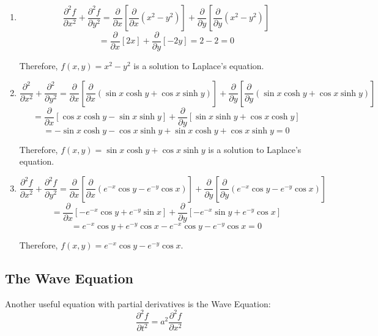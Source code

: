 \begin{Answer}[ref = laplace]
\begin{enumerate}
    \item $$\frac{\partial^2 f}{\partial x^2} + \frac{\partial^2 f}{\partial 
    y^2} = \frac{\partial}{\partial x} \left[ \frac{\partial}{\partial x} 
    \left( x^2 - y^2 \right) \right] + \frac{\partial}{\partial y} \left[ 
    \frac{\partial}{\partial y} \left( x^2 - y^2 \right) \right]$$
    $$= \frac{\partial}{\partial x} \left[ 2x \right] + \frac{\partial}{
    \partial y} \left[ -2y \right] = 2 - 2 = 0$$

    Therefore, $f(x, y) = x^2 - y^2$ is a solution to Laplace's equation. 

    \item $$\frac{\partial^2}{\partial x^2} + \frac{\partial^2}{\partial y^2} 
    = \frac{\partial}{\partial x} \left[ \frac{\partial}{\partial x} \left( 
    \sin{x} \cosh{y} + \cos{x} \sinh{y} \right) \right] + \frac{\partial}{
    \partial y} \left[ \frac{\partial}{\partial y} \left( \sin{x} \cosh{y} + 
    \cos{x} \sinh{y} \right) \right]$$
    $$= \frac{\partial}{\partial x} \left[ \cos{x} \cosh{y} - \sin{x} \sinh{y} 
    \right] + \frac{\partial}{\partial y} \left[ \sin{x} \sinh{y} + \cos{x} 
    \cosh{y} \right]$$
    $$= -\sin{x}\cosh{y} - \cos{x}\sinh{y} + \sin{x}\cosh{y} + \cos{x} \sinh{
    y} = 0$$

    Therefore, $f(x, y) = \sin{x}\cosh{y} + \cos{x}\sinh{y}$ is a solution to 
    Laplace's equation.

    \item $$\frac{\partial^2 f}{\partial x^2} + \frac{\partial^2 f}{\partial 
    y^2} = \frac{\partial}{\partial x} \left[ \frac{\partial}{\partial x} 
    \left( e^{-x}\cos{y} - e^{-y}\cos{x} \right) \right] + \frac{\partial}{
    \partial y} \left[ \frac{\partial}{\partial y} \left( e^{-x} \cos{y} - 
    e^{-y} \cos{x} \right) \right]$$
    $$= \frac{\partial}{\partial x} \left[ -e^{-x}\cos{y} + e^{-y}\sin{x} 
    \right] + \frac{\partial}{\partial y} \left[ -e^{-x}\sin{y} + e^{-y} 
    \cos{x} \right]$$
    $$= e^{-x} \cos{y} + e^{-y} \cos{x} - e^{-x} \cos{y} - e^{-y} \cos{x} = 0$$

    Therefore, $f(x, y) = e^{-x}\cos{y} - e^{-y}\cos{x}$.
\end{enumerate}
\end{Answer}

\subsection{The Wave Equation}
Another useful equation with partial derivatives is the Wave Equation:
$$\frac{\partial^2 f}{\partial t^2} = a^2 \frac{\partial^2 f}{\partial x^2}$$

